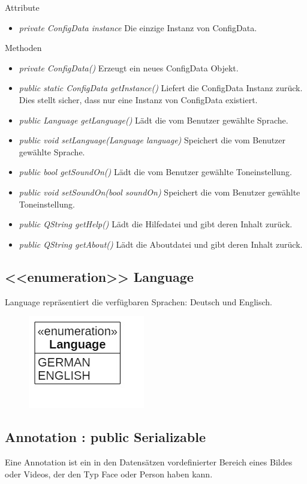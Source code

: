 Attribute
\begin{itemize}
\item\textit{private ConfigData instance} Die einzige Instanz von ConfigData. 
\end{itemize}

Methoden
\begin{itemize}
\item \textit{private ConfigData()} Erzeugt ein neues ConfigData Objekt.
\item \textit{public static ConfigData getInstance()} Liefert die ConfigData Instanz zurück. Dies stellt sicher, dass nur eine Instanz von ConfigData existiert.
\item \textit{public Language getLanguage()} Lädt die vom Benutzer gewählte Sprache.
\item \textit{public void setLanguage(Language language)} Speichert die vom Benutzer gewählte Sprache.
\item \textit{public bool getSoundOn()} Lädt die vom Benutzer gewählte Toneinstellung.
\item \textit{public void setSoundOn(bool soundOn)} Speichert die vom Benutzer gewählte Toneinstellung.
\item \textit{public QString getHelp()} Lädt die Hilfedatei und gibt deren Inhalt zurück.
\item \textit{public QString getAbout()} Lädt die Aboutdatei und gibt deren Inhalt zurück.
\end{itemize}

\subsection*{<<enumeration>> Language}
Language repräsentiert die verfügbaren Sprachen: Deutsch und Englisch.

\begin{figure}[H]
\centering
\includegraphics[scale=0.5]{img/Klassendiagramm/Klassen/Model/Language}
\label{fig:language}
\end{figure}

\subsection*{\gls{Annotation} : public Serializable}
Eine \gls{Annotation} ist ein in den Datensätzen vordefinierter Bereich eines Bildes oder Videos, der den Typ Face oder Person haben kann.


